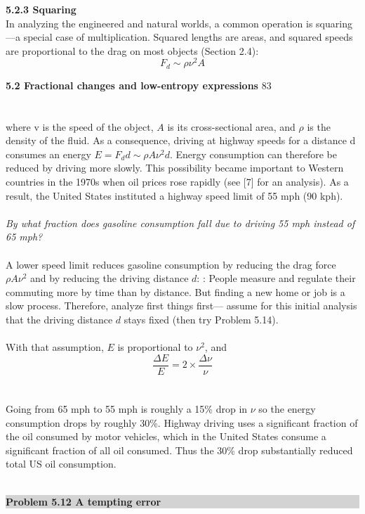 \documentclass{book}
\begin{document}
{\textbf{5.2.3 Squaring}
\\

\large{In analyzing the engineered and natural worlds, a common operation is
squaring—a special case of multiplication. Squared lengths are areas, and
squared speeds are proportional to the drag on most objects (Section 2.4):}
\begin{equation}
F_{d}\sim \rho \nu^{2}A
 \end{equation}

\newpage
\textbf{5.2 Fractional changes and low-entropy expressions} \hfill{83}\\
\\
\\
\large{where v is the speed of the object, $A$ is its cross-sectional area, and $\rho$ is
the density of the fluid. As a consequence, driving at highway speeds for
a distance d consumes an energy $E=F_{d} d \sim \rho A \nu^{2}d$. Energy consumption
can therefore be reduced by driving more slowly. This possibility became
important to Western countries in the 1970s when oil prices rose rapidly
(see [7] for an analysis). As a result, the United States instituted a highway
speed limit of 55 mph (90 kph).}
\\
\\
\textit{By what fraction does gasoline consumption fall due to driving 55 mph instead
of 65 mph?}
\\
\\
\large{A lower speed limit reduces gasoline consumption by reducing the drag
force $\rho A \nu^{2}$ and by reducing the driving distance $d$: : People measure and
regulate their commuting more by time than by distance. But finding a
new home or job is a slow process. Therefore, analyze first things first—
assume for this initial analysis that the driving distance $d$ stays fixed (then
try Problem 5.14).}
\\
\\
\large{With that assumption, $E$ is proportional to $\nu^{2}$, and}
\begin{equation}
\frac{\Delta E}{E}=2 \times \frac{\Delta \nu}{\nu}
\end{equation}
\\
\\
\large{Going from 65 mph to 55 mph is roughly a 15\% drop in $\nu$ so the energy
consumption drops by roughly 30\%. Highway driving uses a significant
fraction of the oil consumed by motor vehicles, which in the United States
consume a significant fraction of all oil consumed. Thus the 30\% drop
substantially reduced total US oil consumption.}
\\
\\
\colorbox{lightgray}{
\begin{minipage}{\textwidth}
 {\textbf{Problem 5.12 A tempting error}
 
}
\end{minipage}}}
\end{document}
